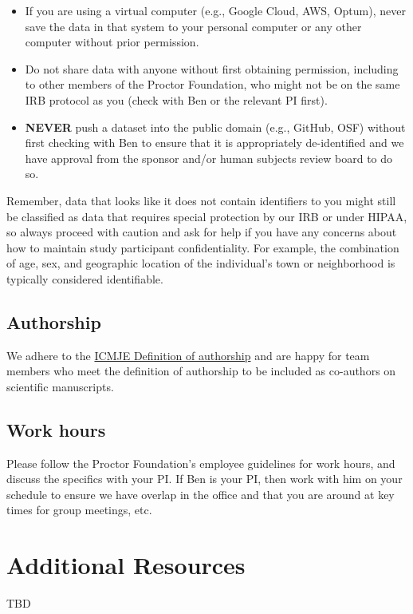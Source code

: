 \documentclass[
]{book}
\providecommand{\tightlist}{%
  \setlength{\itemsep}{0pt}\setlength{\parskip}{0pt}}
\begin{document}
\begin{itemize}
\tightlist
\item
  If you are using a virtual computer (e.g., Google Cloud, AWS, Optum), never save the data in that system to your personal computer or any other computer without prior permission.
\item
  Do not share data with anyone without first obtaining permission, including to other members of the Proctor Foundation, who might not be on the same IRB protocol as you (check with Ben or the relevant PI first).
\item
  \textbf{NEVER} push a dataset into the public domain (e.g., GitHub, OSF) without first checking with Ben to ensure that it is appropriately de-identified and we have approval from the sponsor and/or human subjects review board to do so.
\end{itemize}

Remember, data that looks like it does not contain identifiers to you might still be classified as data that requires special protection by our IRB or under HIPAA, so always proceed with caution and ask for help if you have any concerns about how to maintain study participant confidentiality. For example, the combination of age, sex, and geographic location of the individual's town or neighborhood is typically considered identifiable.

\hypertarget{authorship}{%
\section{Authorship}\label{authorship}}

We adhere to the \href{http://www.icmje.org/recommendations/browse/roles-and-responsibilities/defining-the-role-of-authors-and-contributors.html}{ICMJE Definition of authorship} and are happy for team members who meet the definition of authorship to be included as co-authors on scientific manuscripts.

\hypertarget{work-hours}{%
\section{Work hours}\label{work-hours}}

Please follow the Proctor Foundation's employee guidelines for work hours, and discuss the specifics with your PI. If Ben is your PI, then work with him on your schedule to ensure we have overlap in the office and that you are around at key times for group meetings, etc.

\hypertarget{resources}{%
\chapter{Additional Resources}\label{resources}}

TBD

\backmatter
  
\end{document}
